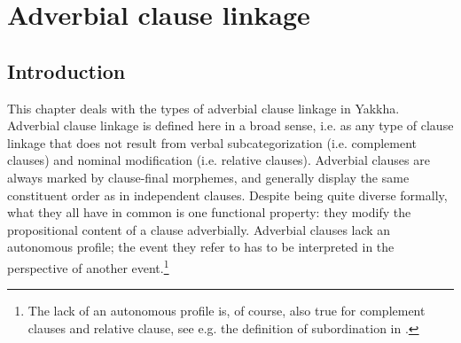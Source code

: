 ﻿

\chapter{Adverbial clause linkage}\label{adv-cl}


\section{Introduction}

This chapter deals with the types of adverbial clause linkage in Yakkha. Adverbial clause linkage is defined here in a broad sense, i.e. as any type of clause linkage that does not result from verbal subcategorization (i.e. complement clauses) and nominal modification (i.e. relative clauses). Adverbial clauses are always marked by clause-final morphemes, and generally display the same constituent order as in independent clauses. 
Despite being quite diverse formally, what they all have in common is one functional property: they modify the propositional content of a clause adverbially. Adverbial clauses lack an autonomous profile; the event they refer to has to be interpreted in the perspective of another event.\footnote{The lack of an autonomous profile is, of course, also true for complement clauses and relative clause, see e.g. the definition of subordination in \citet{Cristofaro2003Subordination}.}


